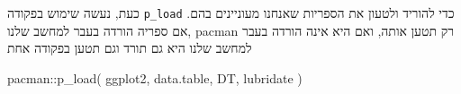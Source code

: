 \documentclass[
]{book}
\newenvironment{Shaded}{\begin{snugshade}}{\end{snugshade}}
\newcommand{\FunctionTok}[1]{\textcolor[rgb]{0.00,0.00,0.00}{#1}}
\newcommand{\NormalTok}[1]{#1}
\newcommand{\SpecialCharTok}[1]{\textcolor[rgb]{0.00,0.00,0.00}{#1}}
\begin{document}
כעת, נעשה שימוש בפקודה
\texttt{p\_load}
כדי להוריד ולטעון את הספריות שאנחנו מעוניינים בהם. אם ספריה הורדה בעבר למחשב שלנו,
pacman
רק תטען אותה,
ואם היא אינה הורדה בעבר למחשב שלנו
היא גם תורד וגם תטען בפקודה אחת

\begin{Shaded}
\begin{Highlighting}[]
\NormalTok{pacman}\SpecialCharTok{::}\FunctionTok{p\_load}\NormalTok{(}
\NormalTok{  ggplot2,}
\NormalTok{  data.table,}
\NormalTok{  DT,}
\NormalTok{  lubridate}
\NormalTok{)}
\end{Highlighting}
\end{Shaded}


  
\end{document}
